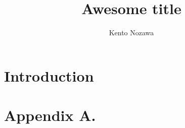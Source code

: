 \documentclass{article}
\begin{document}
\title{Awesome title}

\author{Kento Nozawa
}


\maketitle

\begin{abstract}

\end{abstract}


\section{Introduction}

\newpage

\appendix
\section*{Appendix A.}
\label{app:theorem}

\vskip 0.2in

\end{document}
